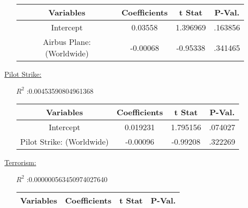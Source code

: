 \documentclass[12pt]{report}
\begin{document}
\begin{enumerate}
\begin{enumerate}
            \begin{tabular}{|c|c|c|c|}
                    \toprule  \hline
                    \textbf{Variables} & \textbf{Coefficients} &  \textbf{t Stat}&\textbf{P-Val.} \\  \hline

                    Intercept & 0.03558 &  1.396969 &.163856\\  \hline
                    Airbus Plane: (Worldwide) & -0.00068 & -0.95338 &.341465 \\  \hline
                    \bottomrule
                \end{tabular}

        \end{enumerate}
    \item[\underline{Pilot Strike:}]
        \begin{enumerate}
            \item[$R^2$]:0.00453590804961368
            \item[]

                \begin{tabular}{|c|c|c|c|}
                    \toprule  \hline
                    \textbf{Variables} & \textbf{Coefficients}   & \textbf{t Stat}&\textbf{P-Val.} \\  \hline

                    Intercept & 0.019231  & 1.795156 &.074027 \\  \hline
                    Pilot Strike: (Worldwide) & -0.00096  & -0.99208 &.322269 \\  \hline
                    \bottomrule
                \end{tabular}





        \end{enumerate}
    \item[\underline{Terrorism:}]\\
        \begin{enumerate}
            \item[$R^2$]:0.000000563450974027640
            \item[]


                \begin{tabular}{|c|c|c|c|}
                    \toprule  \hline
                    \textbf{Variables} & \textbf{Coefficients} & \textbf{t Stat}&\textbf{P-Val.} \\  \hline


\end{tabular}
\end{enumerate}
\end{enumerate}
\end{document}
